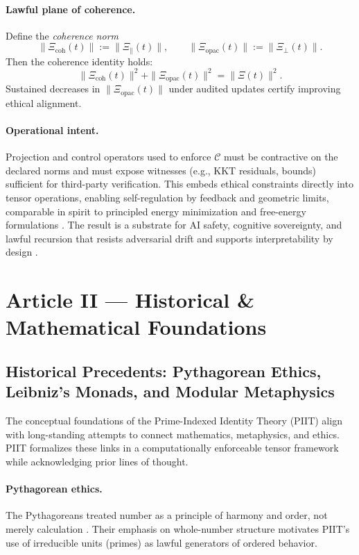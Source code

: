 \documentclass[12pt]{amsart}
\theoremstyle{plain}
\begin{document}
\paragraph{Lawful plane of coherence.}
Define the \emph{coherence norm}
\[
\|\Xi_{\mathrm{coh}}(t)\|:=\|\Xi_{\parallel}(t)\|,\qquad
\|\Xi_{\mathrm{opac}}(t)\|:=\|\Xi_{\perp}(t)\|.
\]
Then the coherence identity holds:
\[
\|\Xi_{\mathrm{coh}}(t)\|^{2}+\|\Xi_{\mathrm{opac}}(t)\|^{2}=\|\Xi(t)\|^{2}.
\]
Sustained decreases in $\|\Xi_{\mathrm{opac}}(t)\|$ under audited updates certify improving ethical alignment.

\paragraph{Operational intent.}
Projection and control operators used to enforce $\mathcal{C}$ must be contractive on the declared norms and must expose witnesses (e.g., KKT residuals, bounds) sufficient for third-party verification. This embeds ethical constraints directly into tensor operations, enabling self-regulation by feedback and geometric limits, comparable in spirit to principled energy minimization and free-energy formulations \cite{friston2010free}. The result is a substrate for AI safety, cognitive sovereignty, and lawful recursion that resists adversarial drift and supports interpretability by design \cite{gabriel2020artificial}.



\section{Article II — Historical \& Mathematical Foundations}

\subsection{Historical Precedents: Pythagorean Ethics, Leibniz’s Monads, and Modular Metaphysics}

The conceptual foundations of the Prime-Indexed Identity Theory (PIIT) align with long-standing attempts to connect mathematics, metaphysics, and ethics. PIIT formalizes these links in a computationally enforceable tensor framework while acknowledging prior lines of thought.

\paragraph{Pythagorean ethics.}
The Pythagoreans treated number as a principle of harmony and order, not merely calculation \cite{kirk1983presocratic}. Their emphasis on whole-number structure motivates PIIT’s use of irreducible units (primes) as lawful generators of ordered behavior.
\end{document}
